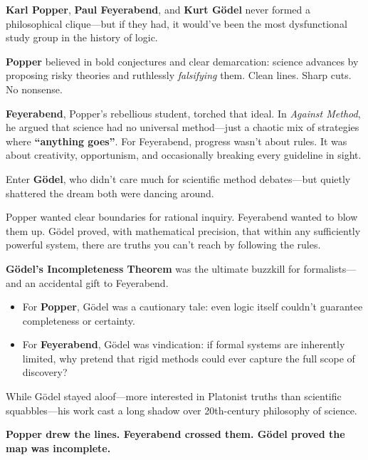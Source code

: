 \begin{tcolorbox}[colback=blue!5!white, colframe=blue!50!black, 
  title={\textbf{Historical Sidebar: Popper, Feyerabend, and Gödel — When Logic Meets Anarchy}}] 

\textbf{Karl Popper}, \textbf{Paul Feyerabend}, and \textbf{Kurt Gödel} never formed a philosophical clique—but if they had, it would’ve been the most dysfunctional study group in the history of logic.

\bigskip

\textbf{Popper} believed in bold conjectures and clear demarcation: science advances by proposing risky theories and ruthlessly \textit{falsifying} them. Clean lines. Sharp cuts. No nonsense.

\textbf{Feyerabend}, Popper’s rebellious student, torched that ideal. In \textit{Against Method}, he argued that science had no universal method—just a chaotic mix of strategies where \textbf{“anything goes”}. For Feyerabend, progress wasn’t about rules. It was about creativity, opportunism, and occasionally breaking every guideline in sight.

\bigskip

Enter \textbf{Gödel}, who didn’t care much for scientific method debates—but quietly shattered the dream both were dancing around.

Popper wanted clear boundaries for rational inquiry. Feyerabend wanted to blow them up. Gödel proved, with mathematical precision, that within any sufficiently powerful system, there are truths you can’t reach by following the rules.

\bigskip

\textbf{Gödel’s Incompleteness Theorem} was the ultimate buzzkill for formalists—and an accidental gift to Feyerabend.

\begin{itemize}
  \item For \textbf{Popper}, Gödel was a cautionary tale: even logic itself couldn’t guarantee completeness or certainty.
  \item For \textbf{Feyerabend}, Gödel was vindication: if formal systems are inherently limited, why pretend that rigid methods could ever capture the full scope of discovery?
\end{itemize}

\bigskip

While Gödel stayed aloof—more interested in Platonist truths than scientific squabbles—his work cast a long shadow over 20th-century philosophy of science.

\textbf{Popper drew the lines. Feyerabend crossed them. Gödel proved the map was incomplete.}

\end{tcolorbox}
